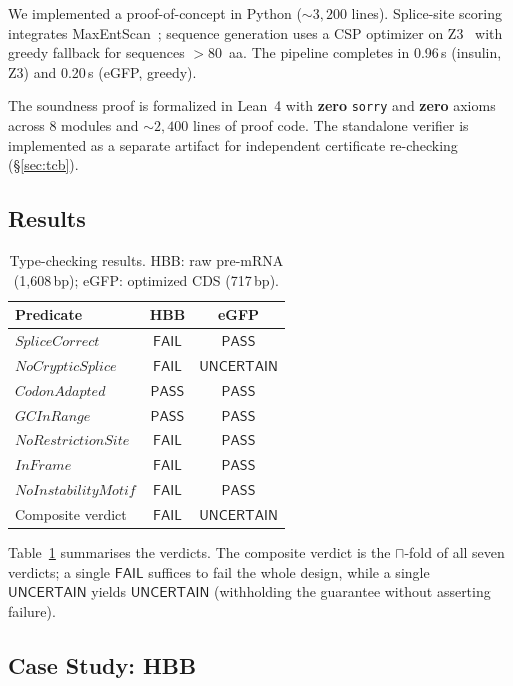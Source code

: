 \documentclass[runningheads]{llncs}
\newcommand{\PASS}{\ensuremath{\mathsf{PASS}}\xspace}
\newcommand{\FAIL}{\ensuremath{\mathsf{FAIL}}\xspace}
\newcommand{\UNCERTAIN}{\ensuremath{\mathsf{UNCERTAIN}}\xspace}
\newcommand{\tand}{\sqcap}
\begin{document}
We implemented a proof-of-concept in Python (${\sim}3{,}200$ lines).
Splice-site scoring integrates MaxEntScan~\cite{yarden2006maxentscan}; sequence generation uses a CSP optimizer on Z3~\cite{demoura2008z3} with greedy fallback for sequences $>$80~aa.
The pipeline completes in 0.96\,s (insulin, Z3) and 0.20\,s (eGFP, greedy).

The soundness proof is formalized in Lean~4 with \textbf{zero} \texttt{sorry} and \textbf{zero} axioms across 8 modules and ${\sim}2{,}400$ lines of proof code.
The standalone verifier is implemented as a separate artifact for independent certificate re-checking (\S\ref{sec:tcb}).

\subsection{Results}

\begin{table}[t]
\centering
\caption{Type-checking results. HBB: raw pre-mRNA (1,608\,bp); eGFP: optimized CDS (717\,bp).}
\label{tab:results}
\begin{tabular}{lcc}
\toprule
\textbf{Predicate} & \textbf{HBB} & \textbf{eGFP} \\
\midrule
$\mathit{SpliceCorrect}$     & \FAIL & \PASS \\
$\mathit{NoCrypticSplice}$   & \FAIL & \UNCERTAIN \\
$\mathit{CodonAdapted}$      & \PASS & \PASS \\
$\mathit{GCInRange}$         & \PASS & \PASS \\
$\mathit{NoRestrictionSite}$ & \FAIL & \PASS \\
$\mathit{InFrame}$           & \FAIL & \PASS \\
$\mathit{NoInstabilityMotif}$& \FAIL & \PASS \\
\midrule
Composite verdict            & \FAIL & \UNCERTAIN \\
\bottomrule
\end{tabular}
\end{table}

Table~\ref{tab:results} summarises the verdicts. The composite verdict is the $\tand$-fold of all seven verdicts; a single \FAIL{} suffices to fail the whole design, while a single \UNCERTAIN{} yields \UNCERTAIN{} (withholding the guarantee without asserting failure).

\subsection{Case Study: HBB}
\end{document}
